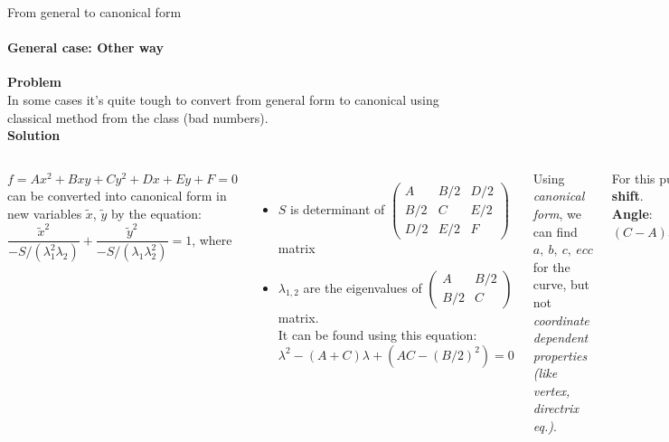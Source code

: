 \documentclass[aspectratio=169]{beamer}
\begin{document}
\begin{frame}[t]{From general to canonical form}
\framesubtitle{General case: Other way}
\scriptsize
\vspace{-0.3cm}
\textbf{Problem}\\
In some cases it's quite tough to convert from general form to canonical using classical method from the class (bad numbers).\\
\textbf{Solution} \smallskip
\begin{columns}[onlytextwidth]
$f = Ax^{2}+Bxy+Cy^{2}+Dx+Ey+F=0$ \\
can be converted into canonical form in new variables $\tilde {x}$, $\tilde {y}$ by the equation:
$
    {\dfrac {{\tilde {x}}^{2}}{-S/(\lambda _{1}^{2}\lambda _{2})}}+{\dfrac {{\tilde {y}}^{2}}{-S/(\lambda _{1}\lambda _{2}^{2})}}=1
$, where \\
\begin{itemize}
    \item $S$ is determinant of $\left({\begin{matrix}A&B/2&D/2\\B/2&C&E/2\\D/2&E/2&F\end{matrix}}\right)$ matrix 
\item $\lambda_{1,2}$ are the eigenvalues of  $\left({\begin{matrix}A&B/2\\B/2&C\end{matrix}}\right)$ matrix.\\
It can be found using this equation:
$
    \lambda ^{2}-(A+C)\lambda +(AC-(B/2)^{2})=0
$
\end{itemize}
Using \textit{canonical form}, we can find $a,\ b,\ c,\ ecc$ for the curve, but not \textit{coordinate dependent properties (like vertex, directrix eq.)}.

For this purpose, we need to find \textbf{angle} and \textbf{shift}.\\
\textbf{Angle}: $(C-A)sin(2\alpha) + Bcos(2\alpha) = 0; \rightarrow \alpha = ...$

\textbf{Shift (center of the curve)}
\begin{equation*}
    \left\{\begin{matrix*}[l] \frac{\partial f}{\partial x}\\ \frac{\partial f}{\partial y} \end{matrix*}\right. \rightarrow \text{2 equations of line} \rightarrow \text{solve system } (x_c;y_c)
\end{equation*}


\end{columns}
\end{frame}
\end{document}
